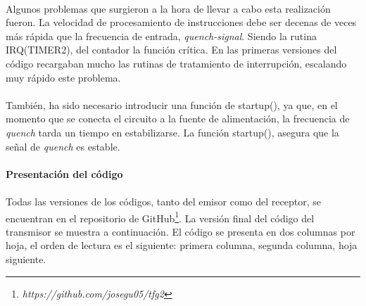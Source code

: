 \paragraph{}
Algunos problemas que surgieron a la hora de llevar a cabo esta realización fueron.
La velocidad de procesamiento de instrucciones debe ser decenas de veces más rápida que la frecuencia de entrada, \textit{quench-signal}. Siendo la rutina IRQ(TIMER2), del contador la función crítica.
En las primeras versiones del código recargaban mucho las rutinas de tratamiento de interrupción, escalando muy rápido este problema.
\paragraph{}
También, ha sido necesario introducir una función de startup(), ya que, en el momento que se conecta el circuito a la fuente de alimentación, la frecuencia de \textit{quench} tarda un tiempo en estabilizarse. La función startup(), asegura que la señal de \textit{quench} es estable.


\paragraph{Presentaci\'on del c\'odigo}
\paragraph{}
Todas las versiones de los c\'odigos, tanto del emisor como del receptor, se encuentran en el repositorio de GitHub\footnote{\textit{https://github.com/josegu05/tfg2}}. La versi\'on final del c\'odigo del transmisor se muestra a continuaci\'on. El c\'odigo se presenta en dos columnas por hoja, el orden de lectura es el siguiente: primera columna, segunda columna, hoja siguiente.

\begin{multicols}{2}

\end{multicols}
